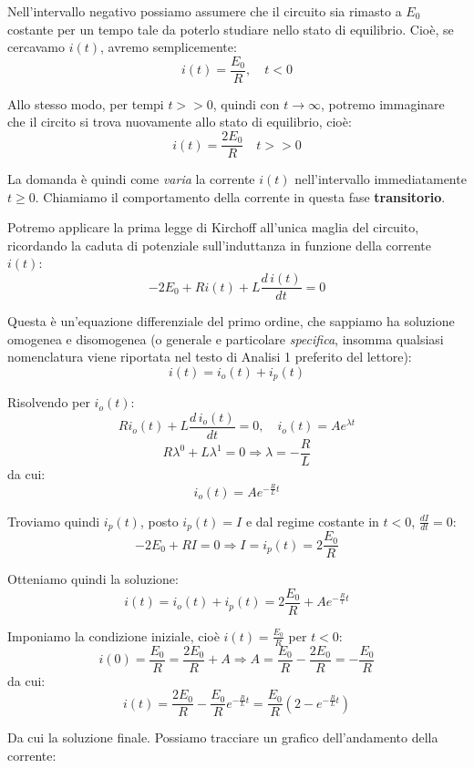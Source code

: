 \documentclass[a4paper,11pt]{article}
\begin{document}
Nell'intervallo negativo possiamo assumere che il circuito sia rimasto a $E_0$ costante per un tempo tale da poterlo studiare nello stato di equilibrio.
Cioè, se cercavamo $i(t)$, avremo semplicemente:
$$
i(t) = \frac{E_0}{R}, \quad t < 0
$$

Allo stesso modo, per tempi $t >> 0$, quindi con $t \rightarrow \infty$, potremo immaginare che il circito si trova nuovamente allo stato di equilibrio, cioè:
$$
i(t) = \frac{2 E_0}{R} \quad t >> 0
$$

La domanda è quindi come \textit{varia} la corrente $i(t)$ nell'intervallo immediatamente $t \geq 0$.
Chiamiamo il comportamento della corrente in questa fase \textbf{transitorio}.

Potremo applicare la prima legge di Kirchoff all'unica maglia del circuito, ricordando la caduta di potenziale sull'induttanza in funzione della corrente $i(t)$:
$$
-2 E_0 + R i(t) + L \frac{d \, i(t)}{dt} = 0
$$

Questa è un'equazione differenziale del primo ordine, che sappiamo ha soluzione omogenea e disomogenea (o generale e particolare \textit{specifica}, insomma qualsiasi nomenclatura viene riportata nel testo di Analisi 1 preferito del lettore):
$$
i(t) = i_o(t) + i_p(t)
$$

Risolvendo per $i_o(t)$:
$$
R i_o(t) + L \frac{d \, i_o(t)}{dt} = 0, \quad i_o(t) = Ae^{\lambda t}
$$
$$
R \lambda^0 + L \lambda^1 = 0 \Rightarrow \lambda = -\frac{R}{L}
$$
da cui:
$$
i_o(t) = Ae^{-\frac{R}{L}t}
$$

Troviamo quindi $i_p(t)$, posto $i_p(t) = I$ e dal regime costante in $t < 0$, $\frac{dI}{dt} = 0$:
$$
-2 E_0 + RI = 0 \Rightarrow I = i_p(t) = 2 \frac{E_0}{R}
$$

Otteniamo quindi la soluzione:
$$
i(t) = i_o(t) + i_p(t) = 2 \frac{E_0}{R} + A e^{-\frac{R}{l}t}
$$

Imponiamo la condizione iniziale, cioè $i(t) = \frac{E_0}{R}$ per $t < 0$:
$$
i(0) = \frac{E_0}{R} = \frac{2 E_0}{R} + A \Rightarrow A = \frac{E_0}{R} - \frac{2 E_0}{R} = -\frac{E_0}{R}
$$
da cui:
$$
i(t) = \frac{2 E_0}{R} - \frac{E_0}{R} e^{-\frac{R}{L}t} = \frac{E_0}{R}\left( 2 - e^{-\frac{R}{L}t} \right)
$$

Da cui la soluzione finale.
Possiamo tracciare un grafico dell'andamento della corrente:

\begin{center}
\end{center}
\end{document}
